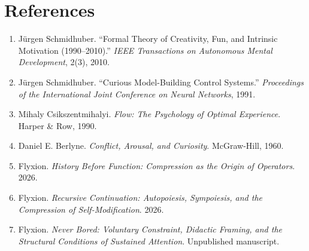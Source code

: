 \documentclass[11pt]{article}
\begin{document}
\section*{References}

\begin{enumerate}
\item J\"urgen Schmidhuber. ``Formal Theory of Creativity, Fun, and Intrinsic Motivation (1990--2010).'' \emph{IEEE Transactions on Autonomous Mental Development}, 2(3), 2010.
\item J\"urgen Schmidhuber. ``Curious Model-Building Control Systems.'' \emph{Proceedings of the International Joint Conference on Neural Networks}, 1991.
\item Mihaly Csikszentmihalyi. \emph{Flow: The Psychology of Optimal Experience}. Harper \& Row, 1990.
\item Daniel E. Berlyne. \emph{Conflict, Arousal, and Curiosity}. McGraw-Hill, 1960.
\item Flyxion. \emph{History Before Function: Compression as the Origin of Operators}. 2026.
\item Flyxion. \emph{Recursive Continuation: Autopoiesis, Sympoiesis, and the Compression of Self-Modification}. 2026.
\item Flyxion. \emph{Never Bored: Voluntary Constraint, Didactic Framing, and the Structural Conditions of Sustained Attention}. Unpublished manuscript.
\end{enumerate}
\end{document}
